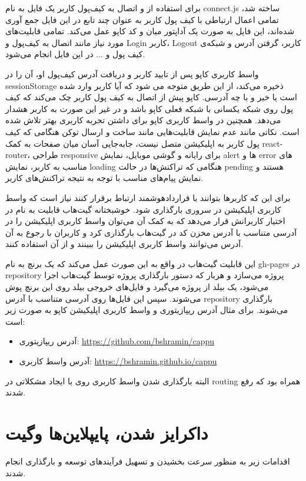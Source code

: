 برای استفاده از
و اتصال به کیف‌پول کاربر یک فایل به نام connect.js ساخته شد، تمامی اعمال ارتباطی با کیف پول کاربر به عنوان چند تابع در این فایل جمع آوری شده‌اند، این فایل به صورت یک آداپتور میان
و کد کاپو عمل می‌کند. تمامی قابلیت‌های مورد نیاز مانند اتصال به کیف‌پول و
\gls{Login}
کاربر،
\gls{Logout}
کاربر، گرفتن آدرس و شبکه‌ی کیف پول و ... در این فایل انجام می‌شود.

واسط کاربری کاپو پس از تایید کاربر و دریافت آدرس کیف‌پول او، آن را در sessionStorage ذخیره می‌کند، از این طریق متوجه می شود که آیا کاربر وارد شده است یا خیر و با چه آدرسی. کاپو پیش از اتصال به کیف پول کاربر چک می‌کند که کیف پول روی شبکه یکسانی با شبکه فعلی کاپو باشد و در غیر این صورت به کاربر هشدار می‌دهد. همچنین در واسط کاربری کاپو برای داشتن تجربه کاربری بهتر تلاش شده است. نکاتی مانند عدم نمایش قابلیت‌هایی مانند ساخت و ارسال توکن هنگامی که کیف پول کاربر به اپلیکیشن متصل نیست، جابه‌جایی آسان میان صفحات به کمک react-router، طراحی responsive برای رایانه و گوشی موبایل، نمایش alert ها و error های مناسب به کاربر، نمایش loading هنگامی که تراکنش‌ها در حالت pending هستند و نمایش پیام‌های مناسب با توجه به نتیجه تراکنش‌های کاربر.

برای این که کاربرها بتوانند با قراردادهوشمند ارتباط برقرار کنند نیاز است که واسط کاربری اپلیکیشن در سروری بارگذاری شود. خوشبختانه گیت‌هاب قابلیت به نام
در اختیار کاربرانش قرار می‌دهد که به کمک آن می‌توان واسط کاربری اپلیکیشن را در آدرسی متناسب با آدرس مخزن کد در گیت‌هاب بارگذاری کرد و کاربران با رجوع به آن آدرس می‌توانند واسط کاربری اپلیکیشن را ببینند و از آن استفاده کنند.

این قابلیت گیت‌هاب در واقع به این صورت عمل می‌کند که یک برنچ به نام gh-pages در repository پروژه می‌سازد و هربار که دستور بارگذاری پروژه توسط گیت‌هاب اجرا می‌شود، یک بیلد از پروژه می‌گیرد و فایل‌های خروجی بیلد روی این برنچ پوش می‌شوند. سپس این فایل‌ها روی آدرسی متناسب با آدرس repository بارگذاری می‌شوند. برای مثال آدرس ریپازیتوری و واسط کاربری اپلیکیشن کاپو به صورت زیر است:
\begin{itemize}
  \item
  آدرس ریپازیتوری: \url{https://github.com/bshramin/cappu}
  \item
  آدرس واسط کاربری: \url{https://bshramin.github.io/cappu}
\end{itemize}
البته بارگذاری شدن واسط کاربری روی
با ایجاد مشکلاتی در routing همراه بود که رفع شدند.


\section{داکرایز شدن، پایپلاین‌ها وگیت}
اقدامات زیر به منظور سرعت بخشیدن و تسهیل فرآیندهای توسعه و بارگذاری انجام شدند.

